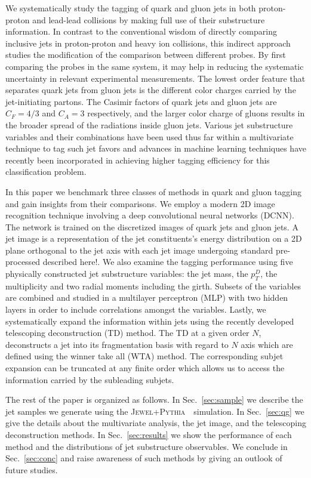 \documentclass[notoc]{JHEP3}
\newcommand{\jwpy}{\textsc{Jewel+Pythia}~}
\begin{document}
We systematically study the tagging of quark and gluon jets in both proton-proton and lead-lead collisions by making full use of their substructure information. In contrast to the conventional wisdom of directly comparing inclusive jets in proton-proton and heavy ion collisions, this indirect approach studies the modification of the comparison between different probes. By first comparing the probes in the same system, it may help in reducing the systematic uncertainty in relevant experimental measurements. The lowest order feature that separates quark jets from gluon jets is the different color charges carried by the jet-initiating partons. The Casimir factors of quark jets and gluon jets are $C_F = 4/3$ and $C_A=3$ respectively, and the larger color charge of gluons results in the broader spread of the radiations inside gluon jets. Various jet substructure variables and their combinations have been used thus far within a multivariate technique to tag such jet favors and advances in machine learning techniques have recently been incorporated in achieving higher tagging efficiency for this classification problem.

In this paper we benchmark three classes of methods in quark and gluon tagging and gain insights from their comparisons. We employ a modern 2D image recognition technique involving a deep convolutional neural networks (DCNN). The network is trained on the discretized images of quark jets and gluon jets. A jet image is a representation of the jet constituents's energy distribution on a 2D plane orthogonal to the jet axis with each jet image undergoing standard pre-processed described here!\cite{}.  We also examine the tagging performance using five physically constructed jet substructure variables: the jet mass, the $p_T^D$, the multiplicity and two radial moments including the girth. Subsets of the variables are combined and studied in a multilayer perceptron (MLP) with two hidden layers in order to include correlations amongst the variables. Lastly, we systematically expand the information within jets using the recently developed telescoping deconstruction (TD) method. The TD at a given order $N$, deconstructs a jet into its fragmentation basis with regard to $N$ axis which are defined using the winner take all (WTA) method. The corresponding subjet expansion can be truncated at any finite order which allows us to access the information carried by the subleading subjets.

The rest of the paper is organized as follows. In Sec.~\ref{sec:sample} we describe the jet samples we generate using the \jwpy ~simulation. In Sec.~\ref{sec:qg} we give the details about the multivariate analysis, the jet image, and the telescoping deconstruction methods. In Sec.~\ref{sec:results} we show the performance of each method and the distributions of jet substructure observables. We conclude in Sec.~\ref{sec:conc} and raise awareness of such methods by giving an outlook of future studies.
\end{document}
